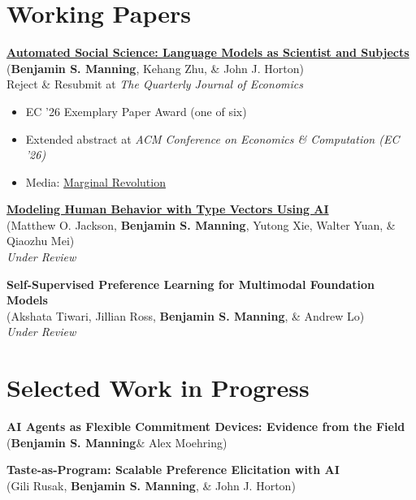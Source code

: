 \documentclass[margin,line,pifont,palatino,courier, 9pt]{res}
\begin{document}
\begin{resume}
\section{\sc Working Papers}

\href{https://www.nber.org/papers/w32381}{\bf Automated Social Science: Language Models as Scientist and Subjects}\\
(\textbf{Benjamin S. Manning}\footnotemark[\value{footnote}], Kehang Zhu\footnotemark[\value{footnote}], \& John J. Horton)\\
Reject \& Resubmit at \textit{The Quarterly Journal of Economics}
\vspace{0.25cm}
\begin{itemize}
\item EC '26 Exemplary Paper Award (one of six)
\item Extended abstract at \textit{ACM Conference on Economics \& Computation (EC '26)}
\item Media: \href{https://marginalrevolution.com/marginalrevolution/2024/03/its-happening-economic-science-edition.html}{Marginal Revolution}
\end{itemize}

\href{https://arxiv.org/abs/2608.18265}{\bf Modeling Human Behavior with Type Vectors Using AI}\\
(Matthew O. Jackson\footnotemark[\value{footnote}], \textbf{Benjamin S. Manning}\footnotemark[\value{footnote}], Yutong Xie\footnotemark[\value{footnote}], Walter Yuan, \& Qiaozhu Mei)\\
\textit{Under Review}

{\bf Self-Supervised Preference Learning for Multimodal Foundation Models}\\
(Akshata Tiwari\footnotemark[\value{footnote}], Jillian Ross, \textbf{Benjamin S. Manning}, \& Andrew Lo)\\
\textit{Under Review}



\section{\sc Selected Work in Progress}


{\bf AI Agents as Flexible Commitment Devices: Evidence from the Field}\\
(\textbf{Benjamin S. Manning}\footnotemark[\value{footnote}] \& Alex Moehring\footnotemark[\value{footnote}])

{\bf Taste-as-Program: Scalable Preference Elicitation with AI}\\
(Gili Rusak\footnotemark[\value{footnote}], \textbf{Benjamin S. Manning}\footnotemark[\value{footnote}], \& John J. Horton)


\end{resume}
\end{document}

